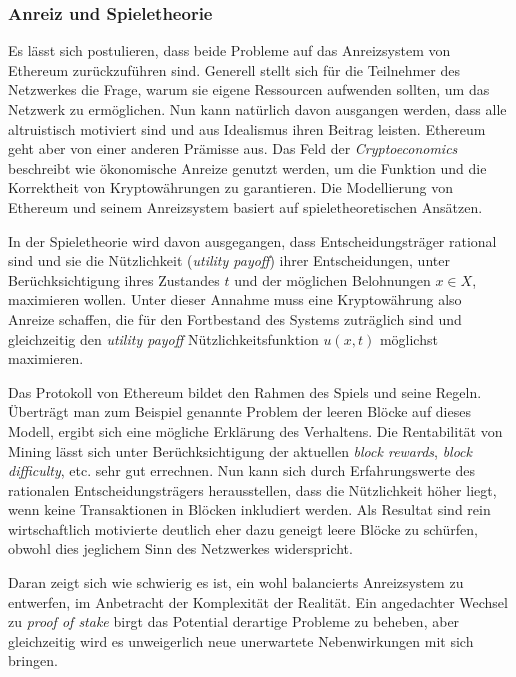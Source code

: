 \documentclass[runningheads]{llncs}
\begin{document}
\subsubsection{Anreiz und Spieletheorie}
Es lässt sich postulieren, dass beide Probleme auf das Anreizsystem von Ethereum zurückzuführen sind. Generell stellt sich für die Teilnehmer des Netzwerkes die Frage, warum sie eigene Ressourcen aufwenden sollten, um das Netzwerk zu ermöglichen. Nun kann natürlich davon ausgangen werden, dass alle altruistisch motiviert sind und aus Idealismus ihren Beitrag leisten. Ethereum geht aber von einer anderen Prämisse aus. Das Feld der \textit{Cryptoeconomics} beschreibt wie ökonomische Anreize genutzt werden, um die Funktion und die Korrektheit von Kryptowährungen zu garantieren. Die Modellierung von Ethereum und seinem Anreizsystem basiert auf spieletheoretischen Ansätzen. \cite{noauthor_cryptoeconomics_nodate}

In der Spieletheorie wird davon ausgegangen, dass Entscheidungsträger rational sind und sie die Nützlichkeit (\textit{utility payoff}) ihrer Entscheidungen, unter Berüchksichtigung ihres Zustandes $ t $ und der möglichen Belohnungen $ x \in X $,  maximieren wollen. Unter dieser Annahme muss eine Kryptowährung also Anreize schaffen, die für den Fortbestand des Systems zuträglich sind und gleichzeitig den \textit{utility payoff} Nützlichkeitsfunktion $ u(x, t) $ möglichst maximieren.  \cite[S. 2 ff.]{myerson_game_1997}

Das Protokoll von Ethereum bildet den Rahmen des Spiels und seine Regeln. Überträgt man zum Beispiel genannte Problem der leeren Blöcke auf dieses Modell, ergibt sich eine mögliche Erklärung des Verhaltens. Die Rentabilität von Mining lässt sich unter Berüchksichtigung der aktuellen \textit{block rewards}, \textit{block difficulty}, etc. sehr gut errechnen. \cite{noauthor_ethereum_nodate} Nun kann sich durch Erfahrungswerte des rationalen Entscheidungsträgers herausstellen, dass die Nützlichkeit höher liegt, wenn keine Transaktionen in Blöcken inkludiert werden. Als Resultat sind rein wirtschaftlich motivierte deutlich eher dazu geneigt leere Blöcke zu schürfen, obwohl dies jeglichem Sinn des Netzwerkes widerspricht.

Daran zeigt sich wie schwierig es ist, ein wohl balancierts Anreizsystem zu entwerfen, im Anbetracht der Komplexität der Realität. Ein angedachter Wechsel zu \textit{proof of stake} birgt das Potential derartige Probleme zu beheben, aber gleichzeitig wird es unweigerlich neue unerwartete Nebenwirkungen mit sich bringen. \cite{noauthor_ethereum/wiki_pos_nodate}
\end{document}
